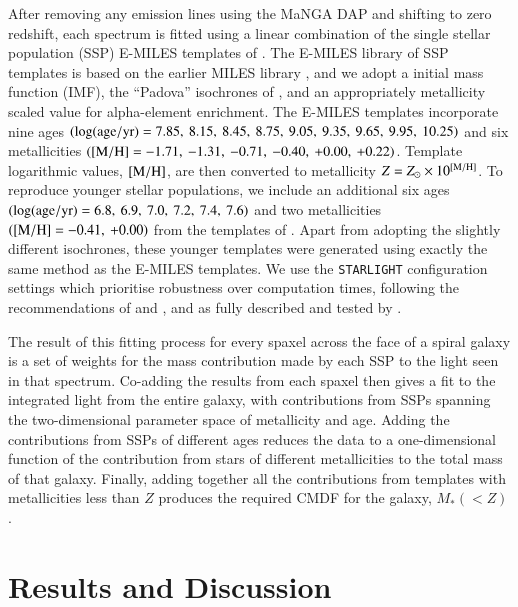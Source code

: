 \documentclass[fleqn,usenatbib]{mnras}
\begin{document}
After removing any emission lines using the MaNGA DAP and shifting to zero redshift, each spectrum is fitted using a linear combination of the single stellar population (SSP) E-MILES templates of \citet{Vazdekis2016UV-extendedGalaxies}. The E-MILES library of SSP templates is based on the earlier MILES library \citep{Vazdekis2010EvolutionarySystem}, and we adopt a \citet{Chabrier2003GalacticFunction} initial mass function (IMF), the ``Padova'' isochrones of \citet{Girardi1999Evolutionary0.03}, and an appropriately metallicity scaled value for alpha-element enrichment. The E-MILES templates incorporate nine ages $(\log(\rm age / yr) = 7.85, \allowbreak \: 8.15, \: 8.45, \: 8.75, \: 9.05, \: 9.35, \: 9.65, \: 9.95, \: 10.25)$ and six metallicities $([\rm M / H] = -1.71, \: -1.31, \: -0.71, \: -0.40, \: +0.00, \: +0.22)$. Template logarithmic values, $\rm [M / H]$, are then converted to metallicity $Z = Z_{\odot} \times 10^{\rm [M / H]}$. To reproduce younger stellar populations, we include an additional six ages $(\log(\rm age / yr) = 6.8, \: 6.9, \: 7.0, \allowbreak \: 7.2, \: 7.4, \: 7.6)$ and two metallicities $([\rm M / H] = -0.41, \: +0.00)$ from the templates of \citet{Asad2017YoungCMDs}. Apart from adopting the slightly different \citet{Bertelli1994TheoreticalOpacities.} isochrones, these younger templates were generated using exactly the same method as the E-MILES templates. We use the \texttt{STARLIGHT} configuration settings which prioritise robustness over computation times, following the recommendations of \citet{Ge2018RecoveringUncertainties} and \citet{CidFernandes2018OnAlgorithms}, and as fully described and tested by \citet[including Appendix~A]{Peterken2020SDSS-IVGalaxies}.

The result of this fitting process for every spaxel across the face of a spiral galaxy is a set of weights for the mass contribution made by each SSP to the light seen in that spectrum. Co-adding the results from each spaxel then gives a fit to the integrated light from the entire galaxy, with contributions from SSPs spanning the two-dimensional parameter space of metallicity and age. Adding the contributions from SSPs of different ages reduces the data to a one-dimensional function of the contribution from stars of different metallicities to the total mass of that galaxy. Finally, adding together all the contributions from templates with metallicities less than $Z$ produces the required CMDF for the galaxy, $M_{*}(< Z)$.


\section{Results and Discussion}
\label{sec:Chemical Evolution History}
\end{document}
